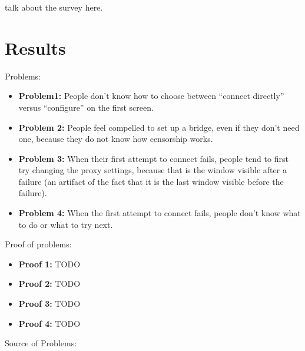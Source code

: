 \documentclass{template}
\begin{document}
{\color {red} talk about the survey here.} 

\section{Results}

Problems: 

\begin{itemize} \itemsep1pt \parskip0pt 
\item {\bfseries Problem1:} People don't know how to choose between ``connect directly'' versus ``configure'' on the first screen. 
\item {\bfseries Problem 2:} People feel compelled to set up a bridge, even if they don't need one, because they do not know how censorship works. 
\item {\bfseries Problem 3:} When their first attempt to connect fails, people tend to first try changing the proxy settings, because that is the window visible after a failure (an artifact of the fact that it is the last window visible before the failure). 
\item {\bfseries Problem 4:} When the first attempt to connect fails, people don't know what to do or what to try next. 
\end{itemize}

Proof of problems: 

\begin{itemize} \itemsep1pt \parskip0pt 
\item {\bfseries Proof 1:} TODO
\item {\bfseries Proof 2:} TODO
\item {\bfseries Proof 3:} TODO
\item {\bfseries Proof 4:} TODO
\end{itemize}

Source of Problems: 
\end{document}
